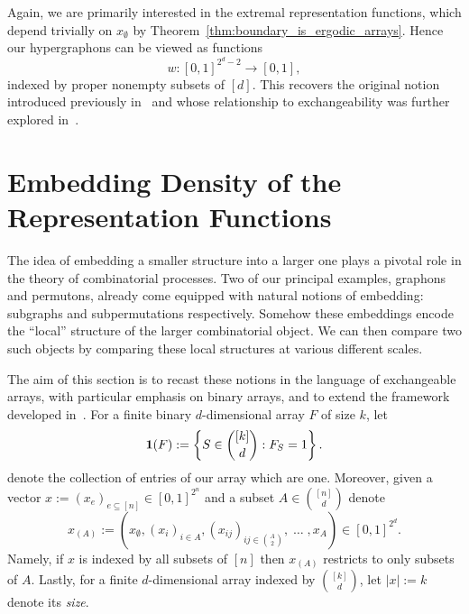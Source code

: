 Again, we are primarily interested in the extremal representation functions, which
depend trivially on $x_\emptyset$ by Theorem~\ref{thm:boundary_is_ergodic_arrays}.
Hence our hypergraphons can be viewed as functions
    \[w:[0,1]^{2^d-2} \to [0,1],\]
\noindent indexed by proper nonempty subsets of $[d]$. This recovers the
original notion introduced previously in~\cite{elek2012_measure_theoretic_dense_hypergraphs} and whose relationship to
exchangeability was further explored in~\cite{austin2008_exchangeable_random_variables}.


\section{Embedding Density of the Representation Functions}
\label{sec:embedding_density_representation_functions}

\noindent The idea of embedding a smaller structure into a larger one plays a pivotal
role in the theory of combinatorial processes. Two of our principal examples,
graphons and permutons, already come equipped with natural notions of
embedding: subgraphs and subpermutations respectively. Somehow these embeddings encode the ``local'' structure of the larger combinatorial
object. We can then compare two such objects by comparing these local structures at various
different scales.


The aim of this section is to recast these notions in the language
of exchangeable arrays, with particular emphasis on binary arrays, and to
extend the framework developed in~\cite{borgs2007_convergent_dense_graph_sequences}. For a finite binary $d$-dimensional
array $F$ of size $k$, let
%
\[\mathbf{1}(F) := \left\{S \in \binom{[k]}{d} : F_S = 1\right\}.\]
%
\noindent denote the collection of entries of our array which are one.
Moreover, given a vector $x := (x_e)_{e \subseteq [n]} \in [0,1]^{2^n}$
and a subset $A \in \binom{[n]}{d}$ denote
%
\[x_{(A)} := \left(x_\emptyset, (x_i)_{i \in A}, (x_{ij})_{ij \in \binom{A}{2}}, \;\ldots \;, x_A\right) \in [0,1]^{2^d}.\]
%
\noindent Namely,
if $x$ is indexed by all subsets of $[n]$ then $x_{(A)}$ restricts to
only subsets of $A$. Lastly, for a finite $d$-dimensional array indexed by $\binom{[k]}{d}$,
let $|x| := k$ denote its \emph{size}.


